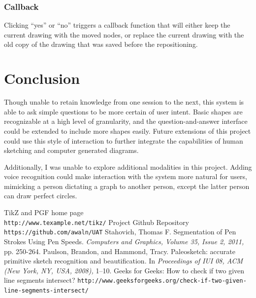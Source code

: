 \documentclass[12pt]{article}
\begin{document}
\subsubsection{Callback}
\par Clicking ``yes'' or ``no'' triggers a callback function that will either keep the current drawing with the moved nodes, or replace the current drawing with the old copy of the drawing that was saved before the repositioning.

\section{Conclusion}
\par Though unable to retain knowledge from one session to the next, this system is able to ask simple questions to be more certain of user intent. Basic shapes are recognizable at a high level of granularity, and the question-and-answer interface could be extended to include more shapes easily. Future extensions of this project could use this style of interaction to further integrate the capabilities of human sketching and computer generated diagrams.\\

\par Additionally, I was unable to explore additional modalities in this project. Adding voice recognition could make interaction with the system more natural for users, mimicking a person dictating a graph to another person, except the latter person can draw perfect circles.

\begin{thebibliography}{5}
TikZ and PGF home page
\\\texttt{http://www.texample.net/tikz/}
Project Github Repository
\\\texttt{https://github.com/awaln/UAT}
Stahovich, Thomas F. Segmentation of Pen Strokes Using Pen Speeds. \textit{Computers and Graphics, Volume 35, Issue 2, 2011,} pp. 250-264.
Paulson, Brandon, and Hammond, Tracy. Paleosketch: accurate primitive sketch
recognition and beautification. In \textit{Proceedings of IUI 08, ACM (New
York, NY, USA, 2008),} 1–10.
Geeks for Geeks: How to check if two given line segments intersect?
\texttt{http://www.geeksforgeeks.org/check-if-two-given-line-segments-intersect/}
\end{thebibliography}
\end{document}
